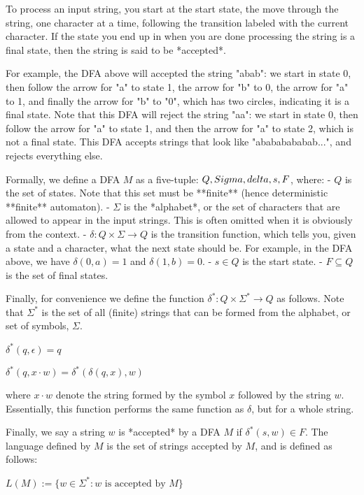 To process an input string, you start at the start state, the move through the string, one character at a time, following the transition labeled with the current character.
If the state you end up in when you are done processing the string is a final state, then the string is said to be *accepted*.

For example, the DFA above will accepted the string "abab": we start in state 0, then follow the arrow for "a" to state 1, the arrow for "b" to 0, the arrow for "a" to 1, and finally the arrow for "b" to "0", which has two circles, indicating it is a final state.
Note that this DFA will reject the string "aa": we start in state 0, then follow the arrow for "a" to state 1, and then the arrow for "a" to state 2, which is not a final state.
This DFA accepts strings that look like "abababababab...", and rejects everything else.

Formally, we define a DFA $M$ as a five-tuple: $Q, \\Sigma, \\delta, s, F$, where:
- $Q$ is the set of states. Note that this set must be **finite** (hence deterministic **finite** automaton).
- $\Sigma$ is the *alphabet*, or the set of characters that are allowed to appear in the input strings. This is often omitted when it is obviously from the context.
- $\delta : Q \times \Sigma \rightarrow Q$ is the transition function, which tells you, given a state and a character, what the next state should be. For example, in the DFA above, we have $\delta(0, a) = 1$ and $\delta(1, b) = 0$.
- $s \in Q$ is the start state.
- $F \subseteq Q$ is the set of final states.

Finally, for convenience we define the function $\delta^* : Q \times \Sigma^* \rightarrow Q$ as follows.
Note that $ \Sigma^* $ is the set of all (finite) strings that can be formed from the alphabet, or set of symbols, $ \Sigma $.

$ \delta^*(q, \epsilon) = q $

$ \delta^*(q, x \cdot w) = \delta^*(\delta(q, x), w)$

where $x \cdot w$ denote the string formed by the symbol $x$ followed by the string $w$.
Essentially, this function performs the same function as $\delta$, but for a whole string.

Finally, we say a string $w$ is *accepted* by a DFA $M$ if $\delta^*(s, w) \in F$.
The language defined by $M$ is the set of strings accepted by $M$, and is defined as follows:

$L(M) := \{ w \in \Sigma^* : w \text{ is accepted by } M\}$

